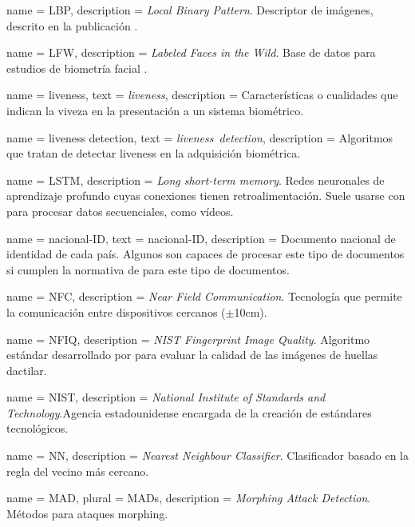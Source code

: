 {
    name        = {LBP},
    description = {\textit{Local Binary Pattern}. Descriptor de imágenes, descrito en la publicación \cite{ojala2000gray}.}
}

{
    name        = {LFW},
    description = {\textit{Labeled Faces in the Wild}. Base de datos para estudios de biometría facial \cite{huang2008labeled}.}
}

{
    name        = {liveness},
    text        = {\textit{liveness}},
    description = {Características o cualidades que indican la viveza en la presentación a un sistema biométrico.}
}

{
    name        = {liveness detection},
    text        = {\mbox{\textit{liveness detection}}},
    description = {Algoritmos que tratan de detectar \gls{liveness} en la adquisición biométrica.}
}

{
    name        = {LSTM},
    description = {\textit{Long short-term memory}. Redes neuronales de aprendizaje profundo cuyas conexiones tienen retroalimentación. Suele usarse con para procesar datos secuenciales, como vídeos.}
}

{
    name        = {nacional-ID},
    text        = {\mbox{nacional-ID}},
    description = {Documento nacional de identidad de cada país. Algunos  son capaces de procesar este tipo de documentos si cumplen la normativa de  \cite{doc20069303} para este tipo de documentos.}
}

{
    name        = {NFC},
    description = {\textit{Near Field Communication}. Tecnología que permite la comunicación entre dispositivos cercanos ($\pm$10cm).}
}

{
    name        = {NFIQ},
    description = {\textit{NIST Fingerprint Image Quality}. Algoritmo estándar desarrollado por  para evaluar la calidad de las imágenes de huellas dactilar.}
}

{
    name        = {NIST},
    description = {\textit{National Institute of Standards and Technology}.Agencia estadounidense encargada de la creación de estándares tecnológicos.}
}

{
    name        = {NN},
    description = {\textit{Nearest Neighbour Classifier}. Clasificador basado en la regla del vecino más cercano.}
}

{
    name        = {MAD},
    plural      = {MADs},
    description = {\textit{Morphing Attack Detection}. Métodos  para ataques \gls{morphing}.}
}

